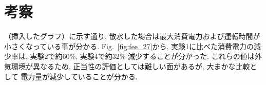 \documentclass[a4j,fleqn,dvipdfmx,uplatex]{jsarticle}
\newcommand{\figref}[1]{Fig.\ \ref{#1}}
\begin{document}
  


\section{考察}\label{sec4}
（挿入したグラフ）に示す通り, 散水した場合は最大消費電力および運転時間が
小さくなっている事が分かる. 
\figref{fig:fee_27}から, 実験1に比べた消費電力の減少率は, 実験2で約60\%, 
実験4で約32\% 減少することが分かった. 
これらの値は外気環境が異なるため, 正当性の評価としては難しい面があるが, 大まかな比較として
電力量が減少していることが分かる. 
\end{document}
